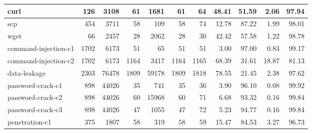 \begin{table*}[htb]
{\begin{tabular}{|l|r|r|r|r|r|r|r|r|r|r|}
            curl                    &                 126 &             3108 &                   61 &              1681 &             61 &          64 &        48.41 &            51.59 &       2.06 &          97.94 \\\hline
            scp                     &                 454 &             3711 &                   58 &               109 &             58 &          74 &        12.78 &            87.22 &       1.99 &          98.01 \\\hline
            wget                    &                  66 &             2457 &                   28 &              2062 &             28 &          30 &        42.42 &            57.58 &       1.22 &          98.78 \\\hline
            command-injection-c1 &                1702 &             6173 &                   51 &                65 &             51 &          51 &         3.00 &            97.00 &       0.83 &          99.17 \\\hline
            command-injection-c2 &                1702 &             6173 &                 1164 &              3417 &           1164 &        1165 &        68.39 &            31.61 &      18.87 &          81.13 \\\hline
            data-leakage            &                2303 &            76478 &                 1809 &             59178 &           1809 &        1818 &        78.55 &            21.45 &       2.38 &          97.62 \\\hline
            password-crack-c1    &                 898 &            44026 &                   35 &               741 &             35 &          36 &         3.90 &            96.10 &       0.08 &          99.92 \\\hline
            password-crack-c2    &                 898 &            44026 &                   60 &             15968 &             60 &          71 &         6.68 &            93.32 &       0.16 &          99.84 \\\hline
            password-crack-c3    &                 898 &            44026 &                   47 &              1055 &             47 &          72 &         5.23 &            94.77 &       0.16 &          99.84 \\\hline
            penetration-c1        &                 375 &             1807 &                   58 &               319 &             58 &          59 &        15.47 &            84.53 &       3.27 &          96.73 \\\hline

\end{tabular}}
\end{table*}
